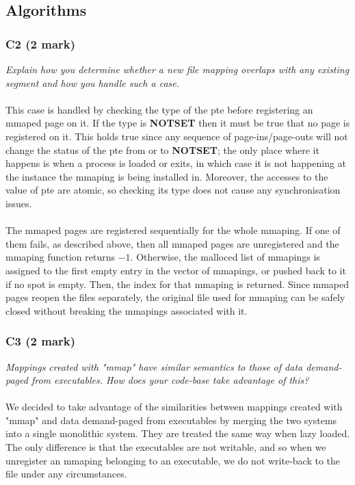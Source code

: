 \documentclass{report}
\newcommand{\question}[1]{\textit{#1} \ }
\newcommand{\const}[1]{\textcolor{BrickRed}{\textbf{#1}}}
\begin{document}
		\subsection*{Algorithms}
			\subsubsection*{C2 (2 mark)}
				\question{Explain how you determine whether a new file mapping overlaps 
				with any existing segment and how you handle such a case.}
				\\
				\\ This case is handled by checking the type of the pte before registering an mmaped page on it.
				If the type is \const{NOTSET} then it must be true that no page is registered on it.
				This holds true since any sequence of page-ins/page-outs will not change the status of
				the pte from or to \const{NOTSET}; the only place where it happens is when a process is loaded or exits,
				in which case it is not happening at the instance the mmaping is being installed in. Moreover, the accesses
				to the value of pte are atomic, so checking its type does not cause any synchronisation issues.
				\\
				\\ The mmaped pages are registered sequentially for the whole mmaping. If one of them fails, as described above, then
				all mmaped pages are unregistered and the mmaping function returns \const{$-1$}. Otherwise, the malloced list of mmapings
				is assigned to the first empty entry in the vector of mmapings, or pushed back to it if no spot is empty. Then, the
				index for that mmaping is returned. Since mmaped pages reopen the files separately, the original file used for mmaping can be safely closed
				without breaking the mmapings associated with it.
			
			\subsubsection*{C3 (2 mark)}
				\question{Mappings created with "mmap" have similar semantics to those of 
				data demand-paged from executables. How does your code-base take advantage 
				of this?}
				\\
				\\We decided to take advantage of the similarities between mappings created with "mmap" and data demand-paged from executables
				by merging the two systems into a single monolithic system. They are treated the same way when lazy loaded. 
				The only difference is that the executables are not writable, and so when we unregister an mmaping belonging to an executable,
				we do not write-back to the file under any circumstances.
				
\end{document}
